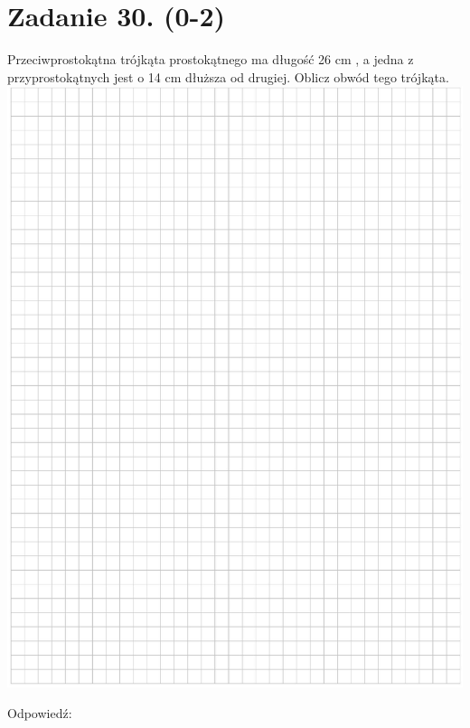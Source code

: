 \documentclass[10pt]{article}
\begin{document}
\section*{Zadanie 30. (0-2)}
Przeciwprostokątna trójkąta prostokątnego ma długość 26 cm , a jedna z przyprostokątnych jest o 14 cm dłuższa od drugiej. Oblicz obwód tego trójkąta.\\
\includegraphics[max width=\textwidth, center]{2024_11_21_7b5527312ea89ae66fd0g-20}

Odpowiedź: \(\qquad\)
\end{document}
